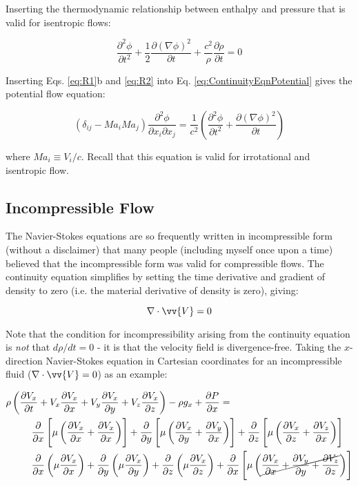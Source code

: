 \documentclass[10pt]{article}
\newcommand{\beq}{\begin{equation}}
\newcommand{\eeq}{\end{equation}}
\newcommand{\beqa}{\begin{equation}\begin{aligned}}
\newcommand{\eeqa}{\end{aligned}\end{equation}}
\begin{document}
\begin{flushleft}
Inserting the thermodynamic relationship between enthalpy and pressure that is valid for isentropic flows:

\beq
\label{eq:R2}
\frac{\partial^2\phi}{\partial t^2}+\frac{1}{2}\frac{\partial (\nabla\phi)^2}{\partial t}+\frac{c^2}{\rho}\frac{\partial\rho}{\partial t}=0
\eeq

Inserting Eqs. \eqref{eq:R1}b and \eqref{eq:R2} into Eq. \eqref{eq:ContinuityEqnPotential} gives the potential flow equation:

\beq
\label{eq:PotentialFlowModel}
\left(\delta_{ij}-Ma_iMa_j\right)\frac{\partial^2\phi}{\partial x_i\partial x_j}=\frac{1}{c^2}\left(\frac{\partial^2\phi}{\partial t^2}+\frac{\partial(\nabla\phi)^2}{\partial t}\right)
\eeq

where \(Ma_i\equiv V_i/c\). Recall that this equation is valid for irrotational and isentropic flow.

\subsection{Incompressible Flow}

The Navier-Stokes equations are so frequently written in incompressible form (without a disclaimer) that many people (including myself once upon a time) believed that the incompressible form was valid for compressible flows. The continuity equation simplifies by setting the time derivative and gradient of density to zero (i.e. the material derivative of density is zero), giving:

\beq
\nabla\cdot\vv{V}=0
\eeq

Note that the condition for incompressibility arising from the continuity equation is {\it not} that \(d\rho/dt=0\) - it is that the velocity field is divergence-free. Taking the \(x\)-direction Navier-Stokes equation in Cartesian coordinates for an incompressible fluid (\(\nabla\cdot\vv{V}=0\)) as an example:

\beqa
\rho&\left(\frac{\partial V_x}{\partial t}+V_x\frac{\partial V_x}{\partial x}+V_y\frac{\partial V_x}{\partial y}+V_z\frac{\partial V_x}{\partial z}\right)-\rho g_x+\frac{\partial P}{\partial x}=\\
&\hspace{0.75cm}\frac{\partial}{\partial x}\left\lbrack\mu\left(\frac{\partial V_x}{\partial x}+\frac{\partial V_x}{\partial x}\right)\right\rbrack+\frac{\partial}{\partial y}\left\lbrack\mu\left(\frac{\partial V_x}{\partial y}+\frac{\partial V_y}{\partial x}\right)\right\rbrack+\frac{\partial}{\partial z}\left\lbrack\mu\left(\frac{\partial V_x}{\partial z}+\frac{\partial V_z}{\partial x}\right)\right\rbrack\\
&\hspace{0.75cm}\frac{\partial}{\partial x}\left(\mu\frac{\partial V_x}{\partial x}\right)+\frac{\partial}{\partial y}\left(\mu\frac{\partial V_x}{\partial y}\right)+\frac{\partial}{\partial z}\left(\mu\frac{\partial V_x}{\partial z}\right)+\frac{\partial}{\partial x}\left\lbrack\mu\left(\cancel{\frac{\partial V_x}{\partial x}+\frac{\partial V_y}{\partial y}+\frac{\partial V_z}{\partial z}}\right)\right\rbrack\\
\eeqa


\end{flushleft}
\end{document}
